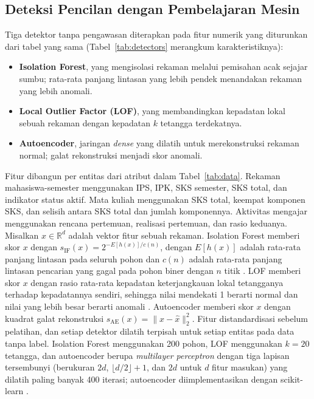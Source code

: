\documentclass[conference]{IEEEtran}
\begin{document}
\subsection{Deteksi Pencilan dengan Pembelajaran Mesin}
Tiga detektor tanpa pengawasan diterapkan pada fitur numerik yang diturunkan dari tabel yang sama (Tabel~\ref{tab:detectors} merangkum karakteristiknya):
\begin{itemize}
\item \textbf{Isolation Forest}, yang mengisolasi rekaman melalui pemisahan acak sejajar sumbu; rata-rata panjang lintasan yang lebih pendek menandakan rekaman yang lebih anomali.
\item \textbf{Local Outlier Factor (LOF)}, yang membandingkan kepadatan lokal sebuah rekaman dengan kepadatan $k$ tetangga terdekatnya.
\item {\raggedright \textbf{Autoencoder}, jaringan \textit{dense} yang dilatih untuk merekonstruksi rekaman normal; galat rekonstruksi menjadi skor anomali.\par}
\end{itemize}
Fitur dibangun per entitas dari atribut dalam Tabel~\ref{tab:data}. Rekaman mahasiswa-semester menggunakan IPS, IPK, SKS semester, SKS total, dan indikator status aktif. Mata kuliah menggunakan SKS total, keempat komponen SKS, dan selisih antara SKS total dan jumlah komponennya. Aktivitas mengajar menggunakan rencana pertemuan, realisasi pertemuan, dan rasio keduanya. Misalkan $x\in\mathbb{R}^d$ adalah vektor fitur sebuah rekaman. Isolation Forest memberi skor $x$ dengan $s_{\mathrm{IF}}(x)=2^{-E[h(x)]/c(n)}$, dengan $E[h(x)]$ adalah rata-rata panjang lintasan pada seluruh pohon dan $c(n)$ adalah rata-rata panjang lintasan pencarian yang gagal pada pohon biner dengan $n$ titik \cite{liu2008iforest}. LOF memberi skor $x$ dengan rasio rata-rata kepadatan keterjangkauan lokal tetangganya terhadap kepadatannya sendiri, sehingga nilai mendekati 1 berarti normal dan nilai yang lebih besar berarti anomali \cite{breunig2000lof}. Autoencoder memberi skor $x$ dengan kuadrat galat rekonstruksi $s_{\mathrm{AE}}(x)=\lVert x-\hat{x}\rVert_2^2$. Fitur distandardisasi sebelum pelatihan, dan setiap detektor dilatih terpisah untuk setiap entitas pada data tanpa label. Isolation Forest menggunakan 200 pohon, LOF menggunakan $k=20$ tetangga, dan autoencoder berupa \textit{multilayer perceptron} dengan tiga lapisan tersembunyi (berukuran $2d$, $\lfloor d/2\rfloor+1$, dan $2d$ untuk $d$ fitur masukan) yang dilatih paling banyak 400 iterasi; autoencoder diimplementasikan dengan scikit-learn \cite{scikit-learn}.
\end{document}
